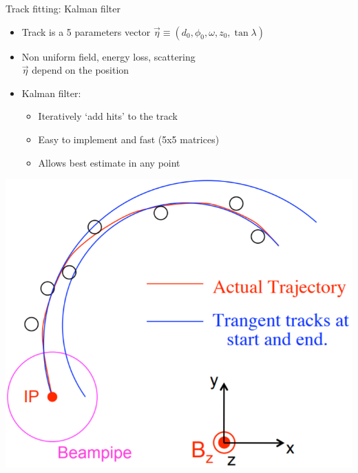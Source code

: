 \documentclass[10pt]{beamer}
\begin{document}
%
\begin{frame}{Track fitting: Kalman filter}

\noindent
\begin{minipage}{.6\textwidth}
	\begin{itemize}
	\setlength\itemsep{0.4cm}
	\item Track is a 5 parameters vector ${\vec{\eta}} \equiv ( d_0, \phi_0, \omega, z_0, \tan \lambda)$
	\item Non uniform field, energy loss, scattering \\${\vec{\eta}}$ depend on the position 
	\item Kalman filter: 
	\begin{itemize}
	\setlength\itemsep{0.2cm}
	\item Iteratively `add hits' to the track
	\item Easy to implement and fast (5x5 matrices)
	\item Allows best estimate in any point
	\end{itemize}
	\end{itemize}
\end{minipage}
\begin{minipage}{0.35\textwidth}
    \centering
	\includegraphics[width=1\textwidth]{Kutschke_Kalman_circ}
\end{minipage}
\end{frame}
\end{document}
